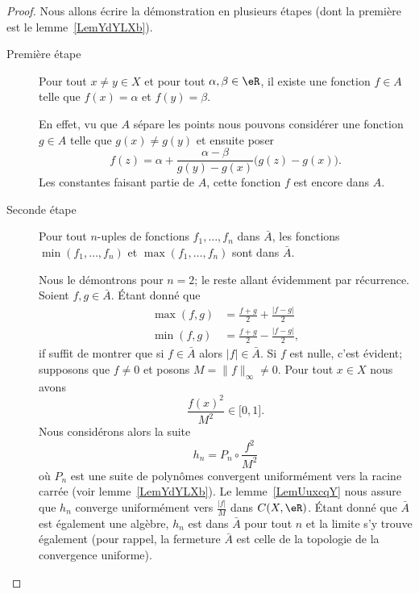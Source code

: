 \begin{proof}
    Nous allons écrire la démonstration en plusieurs étapes (dont la première est le lemme~\ref{LemYdYLXb}).

    \begin{description}
        \item[Première étape] Pour tout \( x\neq y\in X\) et pour tout \( \alpha,\beta\in \eR\), il existe une fonction \( f\in A\) telle que \( f(x)=\alpha\) et \( f(y)=\beta\).

            En effet, vu que \( A\) sépare les points nous pouvons considérer une fonction \( g\in A\) telle que \( g(x)\neq g(y)\) et ensuite poser
            \begin{equation}
                f(z)=\alpha+\frac{ \alpha-\beta }{ g(y)-g(x) }\big( g(z)-g(x) \big).
            \end{equation}
            Les constantes faisant partie de \( A\), cette fonction \( f\) est encore dans \( A\).

        \item[Seconde étape] Pour tout \( n\)-uples de fonctions \( f_1,\ldots, f_n\) dans \( \bar A\), les fonctions \( \min(f_1,\ldots, f_n)\) et \( \max(f_1,\ldots, f_n)\) sont dans \( \bar A\).

            Nous le démontrons pour \( n=2\); le reste allant évidemment par récurrence. Soient \( f,g\in \bar A\). Étant donné que
            \begin{subequations}
                \begin{align}
                    \max(f,g)&=\frac{ f+g }{2}+\frac{ | f-g | }{2}\\
                    \min(f,g)&=\frac{ f+g }{2}-\frac{ | f-g | }{2},
                \end{align}
            \end{subequations}
            if suffit de montrer que si \( f\in\bar A\) alors \( | f |\in \bar A\). Si \( f\) est nulle, c'est évident; supposons que \( f\neq 0\) et posons \( M=\| f \|_{\infty}\neq 0\). Pour tout \( x\in X\) nous avons
            \begin{equation}
                \frac{ f(x)^2 }{ M^2 }\in \mathopen[ 0 , 1 \mathclose].
            \end{equation}
            Nous considérons alors la suite
            \begin{equation}
                h_n=P_n\circ\frac{ f^2 }{ M^2 }
            \end{equation}
            où \( P_n\) est une suite de polynômes convergent uniformément vers la racine carrée (voir lemme~\ref{LemYdYLXb}). Le lemme~\ref{LemUuxcqY} nous assure que \( h_n\) converge uniformément vers \( \frac{ | f | }{ M }\) dans \( C(X,\eR)\). Étant donné que \( \bar A\) est également une algèbre, \( h_n\) est dans \( \bar A\) pour tout \( n\) et la limite s'y trouve également (pour rappel, la fermeture \( \bar A\) est celle de la topologie de la convergence uniforme).


\end{description}
\end{proof}
